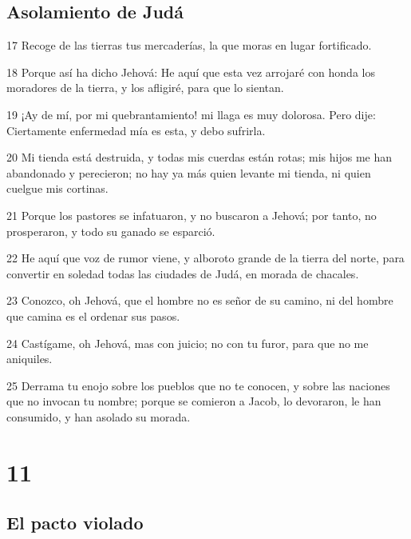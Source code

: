 \section*{Asolamiento de Judá}

\par 17 Recoge de las tierras tus mercaderías, la que moras en lugar fortificado.
\par 18 Porque así ha dicho Jehová: He aquí que esta vez arrojaré con honda los moradores de la tierra, y los afligiré, para que lo sientan.
\par 19 ¡Ay de mí, por mi quebrantamiento! mi llaga es muy dolorosa. Pero dije: Ciertamente enfermedad mía es esta, y debo sufrirla.
\par 20 Mi tienda está destruida, y todas mis cuerdas están rotas; mis hijos me han abandonado y perecieron; no hay ya más quien levante mi tienda, ni quien cuelgue mis cortinas.
\par 21 Porque los pastores se infatuaron, y no buscaron a Jehová; por tanto, no prosperaron, y todo su ganado se esparció.
\par 22 He aquí que voz de rumor viene, y alboroto grande de la tierra del norte, para convertir en soledad todas las ciudades de Judá, en morada de chacales.
\par 23 Conozco, oh Jehová, que el hombre no es señor de su camino, ni del hombre que camina es el ordenar sus pasos.
\par 24 Castígame, oh Jehová, mas con juicio; no con tu furor, para que no me aniquiles.
\par 25 Derrama tu enojo sobre los pueblos que no te conocen, y sobre las naciones que no invocan tu nombre; porque se comieron a Jacob, lo devoraron, le han consumido, y han asolado su morada.

\chapter{11}

\section*{El pacto violado}

